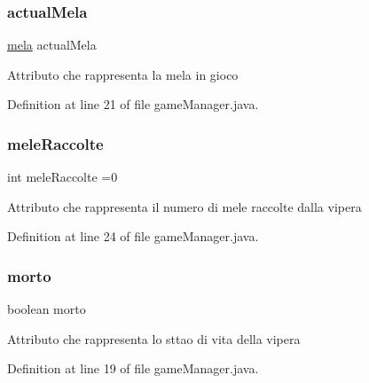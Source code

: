 \subsubsection{\texorpdfstring{actual\+Mela}{actualMela}}
{\footnotesize\ttfamily \mbox{\hyperlink{class_snake_1_1game_1_1vipera_1_1mela}{mela}} actual\+Mela\hspace{0.3cm}{\ttfamily [private]}}

Attributo che rappresenta la mela in gioco 

Definition at line 21 of file game\+Manager.\+java.

\mbox{\label{class_snake_1_1game_1_1utility_1_1game_manager_a6ccf94c481d483cdef8cca4743754db4}} 
\subsubsection{\texorpdfstring{mele\+Raccolte}{meleRaccolte}}
{\footnotesize\ttfamily int mele\+Raccolte =0\hspace{0.3cm}{\ttfamily [private]}}

Attributo che rappresenta il numero di mele raccolte dalla vipera 

Definition at line 24 of file game\+Manager.\+java.

\mbox{\label{class_snake_1_1game_1_1utility_1_1game_manager_a415d6bb79054489c86349a855c1015be}} 
\subsubsection{\texorpdfstring{morto}{morto}}
{\footnotesize\ttfamily boolean morto\hspace{0.3cm}{\ttfamily [private]}}

Attributo che rappresenta lo sttao di vita della vipera 

Definition at line 19 of file game\+Manager.\+java.

